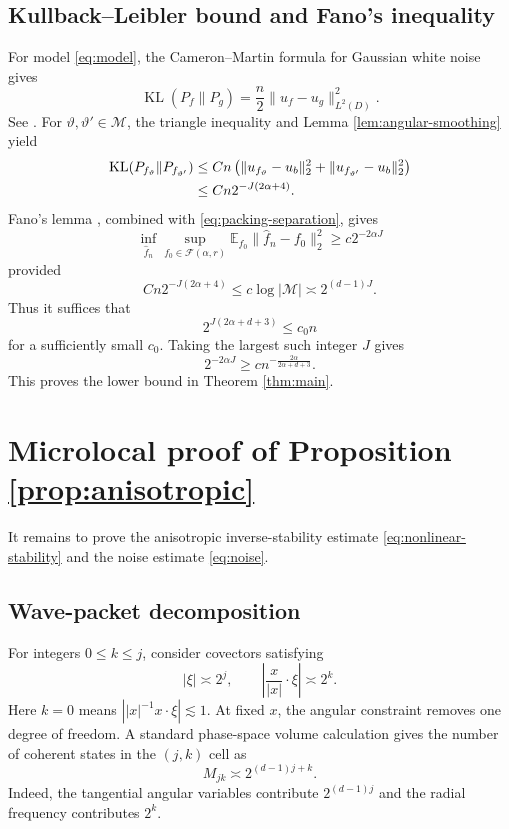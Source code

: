\documentclass[11pt,a4paper]{article}
\theoremstyle{remark}
\numberwithin{equation}{section}
\newcommand{\E}{\mathbb{E}}
\newcommand{\KL}{\operatorname{KL}}
\newcommand{\Fcal}{\mathcal F}
\begin{document}
\subsection{Kullback--Leibler bound and Fano's inequality}

For model \eqref{eq:model}, the Cameron--Martin formula for Gaussian white
noise gives
\begin{equation}\label{eq:KL}
\KL(P_f\|P_g)
=
\frac n2\|u_f-u_g\|_{L^2(D)}^2.
\end{equation}
See \cite[Chapter 6]{GN}. For $\vartheta,\vartheta'\in\mathcal M$, the
triangle inequality and Lemma \ref{lem:angular-smoothing} yield
\begin{align}
\KL(P_{f_\vartheta}\|P_{f_{\vartheta'}})
&\leq
Cn\left(
\|u_{f_\vartheta}-u_b\|_2^2
+
\|u_{f_{\vartheta'}}-u_b\|_2^2
\right)
\notag\\
&\leq
Cn2^{-J(2\alpha+4)}.
\label{eq:KL-bound}
\end{align}
Fano's lemma \cite[Theorem 2.5]{Tsybakov}, combined with
\eqref{eq:packing-separation}, gives
\[
\inf_{\widehat f_n}
\sup_{f_0\in\Fcal(\alpha,r)}
\E_{f_0}\|\widehat f_n-f_0\|_2^2
\geq
c2^{-2\alpha J}
\]
provided
\[
Cn2^{-J(2\alpha+4)}
\leq
c\log|\mathcal M|
\asymp
2^{(d-1)J}.
\]
Thus it suffices that
\[
2^{J(2\alpha+d+3)}\leq c_0n
\]
for a sufficiently small $c_0$. Taking the largest such integer $J$ gives
\[
2^{-2\alpha J}
\geq
c n^{-\frac{2\alpha}{2\alpha+d+3}}.
\]
This proves the lower bound in Theorem \ref{thm:main}.

\section{Microlocal proof of Proposition \ref{prop:anisotropic}}
\label{sec:microlocal}

It remains to prove the anisotropic inverse-stability estimate
\eqref{eq:nonlinear-stability} and the noise estimate \eqref{eq:noise}.

\subsection{Wave-packet decomposition}

For integers $0\leq k\leq j$, consider covectors satisfying
\[
|\xi|\asymp 2^j,
\qquad
\left|\frac{x}{|x|}\cdot\xi\right|\asymp 2^k.
\]
Here $k=0$ means $\left||x|^{-1}x\cdot\xi\right|\lesssim 1$. At fixed $x$,
the angular constraint removes one degree of freedom. A standard
phase-space volume calculation gives the number of coherent states in the
$(j,k)$ cell as
\begin{equation}\label{eq:multiplicity}
M_{jk}\asymp 2^{(d-1)j+k}.
\end{equation}
Indeed, the tangential angular variables contribute $2^{(d-1)j}$ and the
radial frequency contributes $2^k$.
\end{document}
